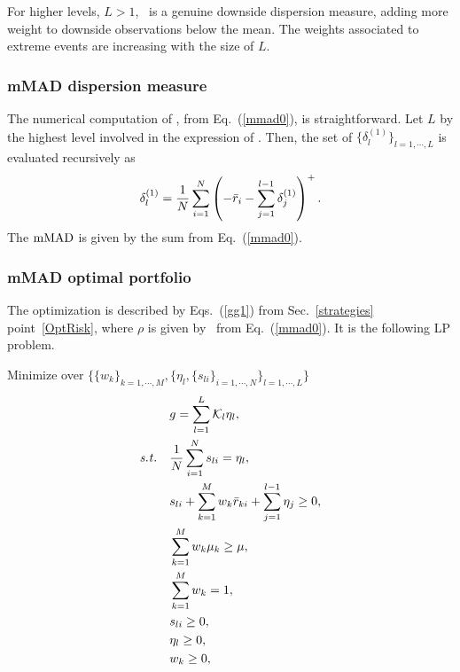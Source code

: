 For higher levels, $L>1$, \mMAD\ is a genuine downside dispersion measure, adding more weight to downside observations below the mean.
The weights associated to extreme events are increasing with the size of $L$.

\BackToContents

\subsubsection{mMAD dispersion measure}
The numerical computation of \mMAD, from Eq.~(\ref{mmad0}), is straightforward.
Let $L$ by the highest level involved in the expression of \mMAD. Then,
the set of $\{\delta^{(1)}_l\}_{l=1,\cdots,L}$ is evaluated recursively as
\begin{equation}
    \delta^{(1)}_l = \frac{1}{N}\sum_{i=1}^N \left( -\br_i -\sum_{j=1}^{l-1} \delta^{(1)}_j \right)^+.
    \label{mmad1}
\end{equation}
The ${\rm mMAD}$ is given by the sum from Eq.~(\ref{mmad0}).

\BackToContents

\subsubsection{mMAD optimal portfolio}
The optimization is described by Eqs.~(\ref{gg1}) from Sec.~\ref{strategies} point~\ref{OptRisk},
where $\rho$ is given by \mMAD\ from Eq.~(\ref{mmad0}).
It is the following LP problem.

\bigskip
\noindent Minimize over $\{ \{w_k\}_{k=1,\cdots,M}, \{ \eta_l, \{ s_{li} \}_{i=1,\cdots,N} \}_{l=1,\cdots,L} \}$
\begin{subequations}\label{mmad2}
\begin{align}
    &g = \sum_{l=1}^L \cK_l \eta_l, \label{mmad2a} \\
    \st &\frac{1}{N} \sum_{i=1}^N s_{li} = \eta_l, \label{mmad2b} \\
        &s_{li} + \sum_{k=1}^M w_k \br_{ki} + \sum_{j=1}^{l-1} \eta_j \geq 0, \label{mmad2c} \\
        &\sum_{k=1}^M w_k \mu_k \geq \mu, \label{mmad2d} \\
        &\sum_{k=1}^M w_k = 1, \label{mmad2e} \\
        & s_{li} \geq 0, \label{mmad2f} \\
        &\eta_l \geq 0, \label{mmad2h} \\
        & w_k \geq 0, \label{mmad2g}
\end{align}
\end{subequations}

